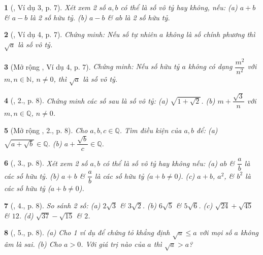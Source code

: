 \documentclass{article}
\newtheorem{baitoan}{}%
\begin{document}
\begin{baitoan}[\cite{Binh_Toan_9_tap_1}, Ví dụ 3, p. 7]
	Xét xem 2 số $a,b$ có thể là số vô tỷ hay không, nếu: (a) $a + b$ \& $a - b$ là 2 số hữu tỷ. (b) $a - b$ \& $ab$ là 2 số hữu tỷ.
\end{baitoan}

\begin{baitoan}[\cite{Binh_Toan_9_tap_1}, Ví dụ 4, p. 7]
	Chứng minh: Nếu số tự nhiên $a$ không là số chính phương thì $\sqrt{a}$ là số vô tỷ.
\end{baitoan}

\begin{baitoan}[Mở rộng \cite{Binh_Toan_9_tap_1}, Ví dụ 4, p. 7]
	Chứng minh: Nếu số hữu tỷ $a$ không có dạng $\dfrac{m^2}{n^2}$ với $m,n\in\mathbb{N}$, $n\ne0$, thì $\sqrt{a}$ là số vô tỷ.
\end{baitoan}

\begin{baitoan}[\cite{Binh_Toan_9_tap_1}, 2., p. 8]
	Chứng minh các số sau là số vô tỷ: (a) $\sqrt{1 + \sqrt{2}}$. (b) $m + \dfrac{\sqrt{3}}{n}$ với $m,n\in\mathbb{Q}$, $n\ne0$.
\end{baitoan}

\begin{baitoan}[Mở rộng \cite{Binh_Toan_9_tap_1}, 2., p. 8]
	Cho $a,b,c\in\mathbb{Q}$. Tìm điều kiện của $a,b$ để: (a) $\sqrt{a + \sqrt{b}}\in\mathbb{Q}$. (b) $a + \dfrac{\sqrt{b}}{c}\in\mathbb{Q}$.
\end{baitoan}

\begin{baitoan}[\cite{Binh_Toan_9_tap_1}, 3., p. 8]
	Xét xem 2 số $a,b$ có thể là số vô tỷ hay không nếu: (a) $ab$ \& $\dfrac{a}{b}$ là các số hữu tỷ. (b) $a + b$ \& $\dfrac{a}{b}$ là các số hữu tỷ ($a + b\ne0$). (c) $a + b$, $a^2$, \& $b^2$ là các số hữu tỷ ($a + b\ne0$).
\end{baitoan}

\begin{baitoan}[\cite{Binh_Toan_9_tap_1}, 4., p. 8]
	So sánh 2 số: (a) $2\sqrt{3}$ \& $3\sqrt{2}$. (b) $6\sqrt{5}$ \& $5\sqrt{6}$. (c) $\sqrt{24} + \sqrt{45}$ \& $12$. (d) $\sqrt{37} - \sqrt{15}$ \& $2$.
\end{baitoan}

\begin{baitoan}[\cite{Binh_Toan_9_tap_1}, 5., p. 8]
	(a) Cho 1 ví dụ để chứng tỏ khẳng định $\sqrt{a}\le a$ với mọi số $a$ không âm là sai. (b) Cho $a > 0$. Với giá trị nào của $a$ thì $\sqrt{a} > a$?
\end{baitoan}
\end{document}
